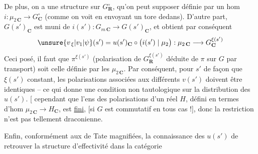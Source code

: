 De plus, on a une structure \inserted{ $\pi$} sur $G_{\mathbf R}^{\circ}$, qu'on peut  supposer définie par un hom  $i:\mu_{2\,\mathbf C}\longrightarrow G_{\mathbf C}^{\circ}$ (comme on voit en envoyant un tore  dedans). D'autre part, $G(s')_{\mathbf C}$ est muni de $i(s'):G_{m\,\mathbf C}\to G(s')_{\mathbf C}$, et  obtient par conséquent
\[
\unsure{v_{\,\xi}|v_{1}|\psi}(s')=u(s')_{\mathbf C}\circ\bigl(i(s')\mid\mu_2\bigr):\mu_{2\,\mathbf C}\longrightarrow G_{\mathbf C}^{\xi(s')}
\]
 Ceci posé, il faut que $\pi^{\xi(s')}$ (polarisation de $G_{\mathbf R}^{\xi(s')}$ déduite de $\pi$ sur $G$ par transport) soit celle définie par les $\mu_{2\,\mathbf C}$. Par conséquent, pour $s'$  de façon que $\xi(s')$  constant, les polarisations  associées aux différents $v(s')$ doivent être identiques -- ce qui donne une condition non tautologique sur la distribution des  $u(s')$. [ cependant que l'ens des  polarisations d'un  réel $H$, défini en termes d'hom $\mu_{2\,\mathbf C}\to H_{\mathbf C}$,  est \uline{fini}, [si $G$ est commutatif en tous cas !], donc la restriction n'est pas tellement draconienne.

Enfin, conformément aux  de Tate magnifiées, la connaissance des $u(s')$  de retrouver la structure d'effectivité dans la catégorie
